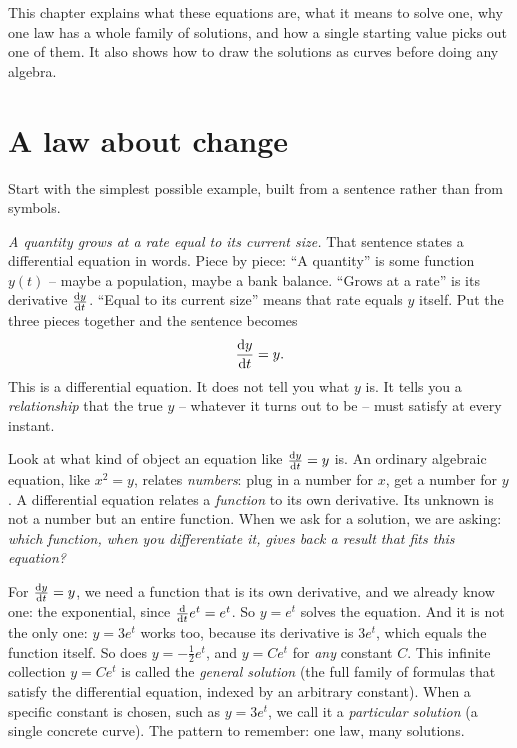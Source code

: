 This chapter explains what these equations are, what it means to solve one, why one law has a whole family of solutions, and how a single starting value picks out one of them. It also shows how to draw the solutions as curves before doing any algebra.

\section{A law about change}
\label{ch36:sec-law}

Start with the simplest possible example, built from a sentence rather than from symbols.

\begin{intuitionbox}
\emph{A quantity grows at a rate equal to its current size.} That sentence states a differential equation in words. Piece by piece: ``A quantity'' is some function $y(t)$ -- maybe a population, maybe a bank balance. ``Grows at a rate'' is its derivative $\frac{\mathrm{d} y}{\mathrm{d} t}$. ``Equal to its current size'' means that rate equals $y$ itself. Put the three pieces together and the sentence becomes
\[
  \frac{\mathrm{d} y}{\mathrm{d} t} = y.
\]
This is a differential equation. It does not tell you what $y$ is. It tells you a \emph{relationship} that the true $y$ -- whatever it turns out to be -- must satisfy at every instant.
\end{intuitionbox}

Look at what kind of object an equation like $\frac{\mathrm{d} y}{\mathrm{d} t} = y$ is. An ordinary algebraic equation, like $x^2 = y$, relates \emph{numbers}: plug in a number for $x$, get a number for $y$. A differential equation relates a \emph{function} to its own derivative. Its unknown is not a number but an entire function. When we ask for a solution, we are asking: \emph{which function, when you differentiate it, gives back a result that fits this equation?}

For $\frac{\mathrm{d} y}{\mathrm{d} t} = y$, we need a function that is its own derivative, and we already know one: the exponential, since $\frac{\mathrm{d} }{\mathrm{d} t}e^t = e^t$. So $y = e^t$ solves the equation. And it is not the only one: $y = 3e^t$ works too, because its derivative is $3e^t$, which equals the function itself. So does $y = -\tfrac{1}{2}e^t$, and $y = Ce^t$ for \emph{any} constant $C$. This infinite collection $y = Ce^t$ is called the \emph{general solution} (the full family of formulas that satisfy the differential equation, indexed by an arbitrary constant). When a specific constant is chosen, such as $y = 3e^t$, we call it a \emph{particular solution} (a single concrete curve). The pattern to remember: one law, many solutions.

